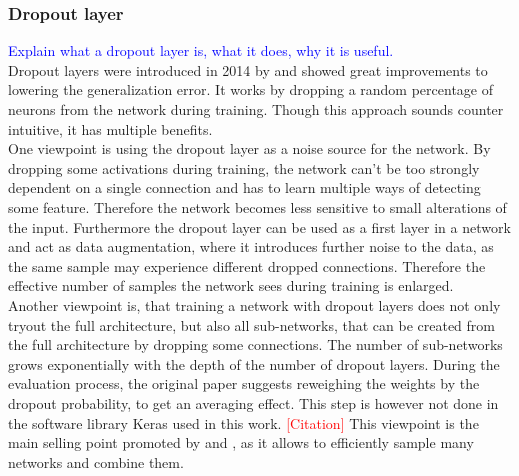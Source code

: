 \subsubsection{Dropout layer}
\textcolor{blue}{Explain what a dropout layer is, what it does, why it is useful.}\\
Dropout layers were introduced in 2014 by \cite{dropout_invention} and showed great improvements to lowering the generalization error. It works by dropping a random percentage of neurons from the network during training. Though this approach sounds counter intuitive, it has multiple benefits.\\
One viewpoint is using the dropout layer as a noise source for the network. By dropping some activations during training, the network can't be too strongly dependent on a single connection and has to learn multiple ways of detecting some feature. Therefore the network becomes less sensitive to small alterations of the input. Furthermore the dropout layer can be used as a first layer in a network and act as data augmentation, where it introduces further noise to the data, as  the same sample may experience different dropped connections. Therefore the effective number of samples the network sees during training is enlarged.\\
Another viewpoint is, that training a network with dropout layers does not only tryout the full architecture, but also all sub-networks, that can be created from the full architecture by dropping some connections. The number of sub-networks grows exponentially with the depth of the number of dropout layers. During the evaluation process, the original paper \cite{dropout_invention} suggests reweighing the weights by the dropout probability, to get an averaging effect. This step is however not done in the software library Keras used in this work. \textcolor{red}{[Citation]} This viewpoint is the main selling point promoted by \cite{deep_learning_book} and \cite{dropout_invention}, as it allows to efficiently sample many networks and combine them.
